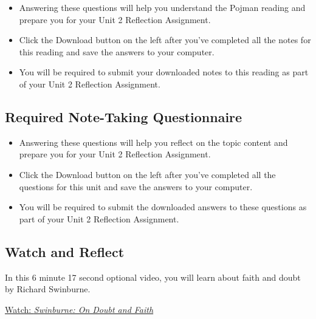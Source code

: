 \documentclass[
]{book}
\providecommand{\tightlist}{%
  \setlength{\itemsep}{0pt}\setlength{\parskip}{0pt}}
\begin{document}
\begin{reflect}
\begin{itemize}
\tightlist
\item
  Answering these questions will help you understand the Pojman reading and prepare you for your Unit 2 Reflection Assignment.
\item
  Click the Download button on the left after you've completed all the notes for this reading and save the answers to your computer.
\item
  You will be required to submit your downloaded notes to this reading as part of your Unit 2 Reflection Assignment.
\end{itemize}
\end{reflect}

\hypertarget{required-note-taking-questionnaire-5}{%
\subsection*{Required Note-Taking Questionnaire}\label{required-note-taking-questionnaire-5}}

\begin{reflect}
\begin{itemize}
\tightlist
\item
  Answering these questions will help you reflect on the topic content and prepare you for your Unit 2 Reflection Assignment.
\item
  Click the Download button on the left after you've completed all the questions for this unit and save the answers to your computer.
\item
  You will be required to submit the downloaded answers to these questions as part of your Unit 2 Reflection Assignment.
\end{itemize}
\end{reflect}

\hypertarget{watch-and-reflect-11}{%
\subsection*{Watch and Reflect}\label{watch-and-reflect-11}}

\begin{reflect}
In this 6 minute 17 second optional video, you will learn about faith and doubt by Richard Swinburne.

\href{https://www.youtube.com/watch?v=exsmSlxnbHQ}{Watch: \emph{Swinburne: On Doubt and Faith}}
\end{reflect}
\end{document}

